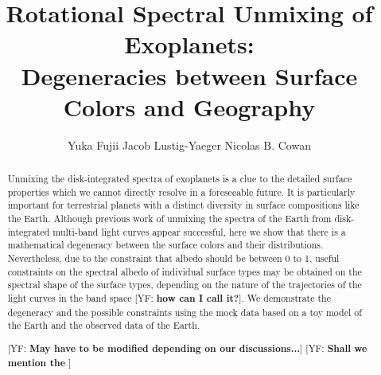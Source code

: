 \documentclass[iop,numberedappendix,apj,]{emulateapj}
\def\memoYF#1{\color{red}[YF: {\bf #1}]\color{black}}
\begin{document}
\title{Rotational Spectral Unmixing of Exoplanets:\\Degeneracies between Surface Colors and Geography}


\author{
%
Yuka Fujii 
%
Jacob Lustig-Yaeger 
%
Nicolas B. Cowan 
%
}

      
  







\vspace{0.5\baselineskip}


\begin{abstract}

Unmixing the disk-integrated spectra of exoplanets is a clue to the detailed surface properties which we cannot directly resolve in a foreseeable future. 
It is particularly important for terrestrial planets with a distinct diversity in surface compositions like the Earth. 
Although previous work of unmixing the spectra of the Earth from disk-integrated multi-band light curves appear successful, here we show that there is a mathematical degeneracy between the surface colors and their distributions. 
Nevertheless, due to the constraint that albedo should be between 0 to 1, useful constraints on the spectral albedo of individual surface types may be obtained on the spectral shape of the surface types, depending on the nature of the trajectories of the light curves in the band space \memoYF{how can I call it?}. 
We demonstrate the degeneracy and the possible constraints using the mock data based on a toy model of the Earth and the observed data of the Earth. 

\memoYF{May have to be modified depending on our discussions...}
\memoYF{Shall we mention the }

\end{abstract}
\end{document}
